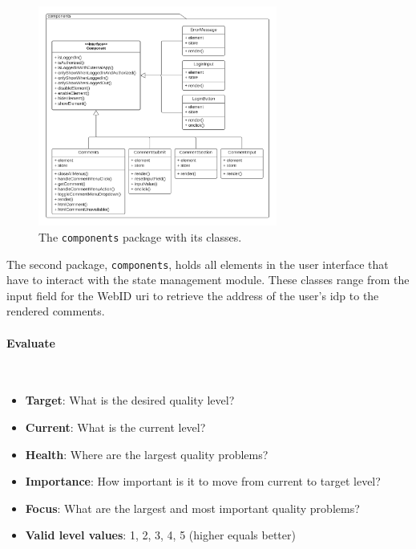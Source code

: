 \begin{figure}[!ht]
    \centering
    \includegraphics[width=0.7\textwidth]{prototype/graphs/poc-comment-package-components.png}
    \caption{The \texttt{components} package with its classes.}
    \label{fig:poc-comment-package-components}
\end{figure}

The second package, \texttt{components}, holds all elements in the user interface that have to interact with the state management module. These classes range from the input field for the WebID \gls{uri} to retrieve the address of the user's \gls{idp} to the rendered comments.

\vspace{0.5cm}
\paragraph{Evaluate}\mbox{}\\

\begin{itemize}
    \item \textbf{Target}: What is the desired quality level?
    \item \textbf{Current}: What is the current level?
    \item \textbf{Health}: Where are the largest quality problems?
    \item \textbf{Importance}: How important is it to move from current to target level?
    \item \textbf{Focus}: What are the largest and most important quality problems?
    \item \textbf{Valid level values}: 1, 2, 3, 4, 5 (higher equals better)
\end{itemize}

